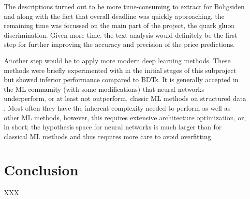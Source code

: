 The descriptions turned out to be more time-consuming to extract for Boligsiden and along with the fact that overall deadline was quickly approaching, the remaining time was focussed on the main part of the project, the quark gluon discrimination. Given more time, the text analysis would definitely be the first step for further improving the accuracy and precision of the price predictions. 

Another step would be to apply more modern deep learning methods. These methods were briefly experimented with in the initial stages of this subproject but showed inferior performance compared to BDTs. It is generally accepted in the ML community (with some modifications) that neural networks underperform, or at least not outperform, classic ML methods on structured  data \autocite{klambauerSelfNormalizingNeuralNetworks2017}. Most often they have the inherent complexity needed to perform as well as other ML methods, however, this requires extensive architecture optimization, or, in short; the hypothesis space for neural networks is much larger than for classical ML methods and thus requires more care to avoid overfitting.

\section{Conclusion}
\label{sec:h:conclusion}

XXX \TODO